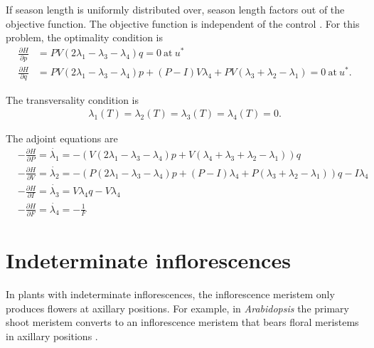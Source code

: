 \documentclass[12pt, oneside]{article}   	%
\begin{document}
If season length is uniformly distributed over, season length factors out of the objective function. The objective function is independent of the control . For this problem, the optimality condition is 
%
\begin{align}
\frac{\partial H}{\partial p} & = PV (2\lambda_1 - \lambda_3-\lambda_4 )q = 0\ \mathrm{at}\ u^* \nonumber \\
\frac{\partial H}{\partial q} & = PV( 2 \lambda_1 - \lambda_3- \lambda_4 )p+(P-I)V \lambda_4+PV (
 \lambda_3+\lambda_2-\lambda_1) = 0\ \mathrm{at}\ u^*.
\end{align}

The transversality condition is
\begin{align}
\lambda_1(T) = \lambda_2(T) = \lambda_3(T) = \lambda_4(T) = 0.
\end{align}

The adjoint equations are
%
\begin{align}
&-\frac{\partial H}{\partial P} = \dot{\lambda_1}  = -( V(2 \lambda_1 - \lambda_3 - \lambda_4)p+V ( \lambda_4+\lambda_3+ \lambda_2 - \lambda_1) )q \nonumber \\
&-\frac{\partial H}{\partial V} = \dot{\lambda_2}  =  -( P ( 2 \lambda_1 - \lambda_3 - \lambda_4 ) p+ ( P-I ) \lambda_4 +P ( \lambda_3+ \lambda_2- \lambda_1) ) q - I \lambda_4 \nonumber \\
&-\frac{\partial H}{\partial I} = \dot{\lambda_3}  = V \lambda_4 q - V \lambda_4  \nonumber \\
&-\frac{\partial H}{\partial F} = \dot{\lambda_4}  = - \frac{1}{F}
\end{align}





\section{Indeterminate inflorescences}

In plants with indeterminate inflorescences, the inflorescence meristem only produces flowers at axillary positions. For example, in \textit{Arabidopsis} the primary shoot meristem converts to an inflorescence meristem that bears floral meristems in axillary positions \cite{bradley1997a}.
\end{document}
